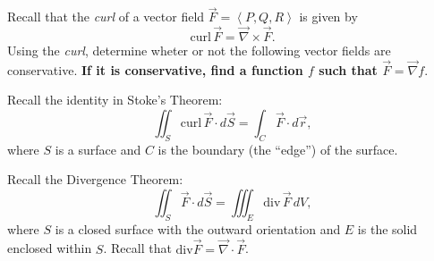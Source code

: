 \documentclass[addpoints, 12pt]{exam}%
\theoremstyle{definition}
\begin{document}
\begin{questions}
\newpage 

\question 
Recall that the \textit{curl} of a vector field $\vec{F} = \left\langle P , Q, R \right\rangle$ is given by
  \[
    \mathrm{curl}\, \vec{F} = \vec{\nabla} \times \vec{F} .
  \]
Using the \textit{curl}, determine wheter or not the following vector fields are conservative. \textbf{If it is conservative, find a function $f$ such that $\vec{F} = \vec{\nabla} f$}.


\newpage 

\question 
Recall the identity in Stoke's Theorem:
  \[
    \iint_S \mathrm{curl} \, \vec{F} \cdot d \vec{S} = \int_C \vec{F} \cdot d \vec{r} ,
  \]
where $S$ is a surface and $C$ is the boundary (the ``edge'') of the surface.

\newpage 

\phantom{2}

\newpage

\question[10]
Recall the Divergence Theorem:
  \[
    \iint_S \vec{F} \cdot d \vec{S} = \iiint_E \mathrm{div} \, \vec{F} \, dV ,
  \]
where $S$ is a closed surface with the outward orientation and $E$ is the solid enclosed within $S$. Recall that $\mathrm{div} \vec{F} = \vec{\nabla} \cdot \vec{F}$.


\end{questions}
\end{document}
